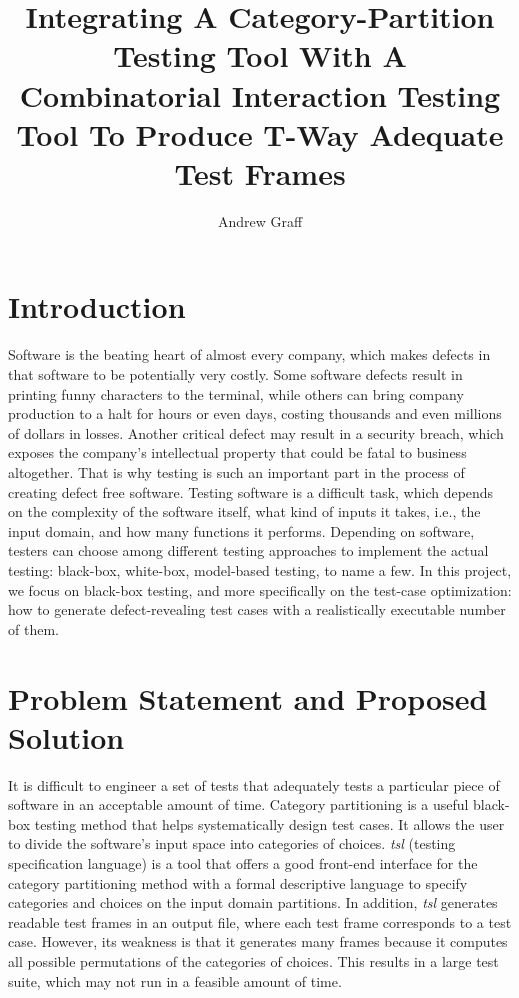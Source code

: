\documentclass[a4full,12pt]{article}
\title{Integrating A Category-Partition Testing Tool With A Combinatorial Interaction
Testing Tool To Produce T-Way Adequate Test Frames}
\author{Andrew Graff}
\begin{document}
\maketitle
\section{Introduction}
Software is the beating heart of almost every company, which makes defects in that software
 to be potentially very costly. Some software defects result in printing funny characters to the terminal, while others can bring
  company production to a halt for hours or even days, costing thousands and even millions of
  dollars in losses. Another critical defect may result in a security breach, which exposes the company's intellectual property that
  could be fatal to business altogether. That is why testing is such an important part in
  the process of creating defect free software. Testing software is a difficult task, which
  depends on the complexity of the software itself, what kind of inputs it takes, i.e., the input domain, and how
  many functions it performs. Depending on software, testers can choose among different testing approaches
  to implement the actual testing: black-box, white-box, model-based testing, to name a few. In this project, we   
  focus on black-box testing, and more specifically on the test-case optimization: how to generate defect-revealing test cases with a realistically executable number of them.
  
\section{Problem Statement and Proposed Solution}
It is difficult to engineer a set of tests that adequately tests a particular piece of software
  in an acceptable amount of time. Category partitioning is a useful black-box testing method that
  helps systematically design test cases. It allows the user to divide
   the software's input space into categories of choices. \emph{tsl} (testing specification language) is a tool
  that offers a good front-end interface for the category partitioning method with a formal descriptive language
  to specify categories and choices on the input domain partitions. In addition, \emph{tsl} generates readable test frames in an output file, where each test frame corresponds to a test case. However, its weakness is that it generates many frames because it computes all possible permutations of the categories of choices. This results in a large test suite, which may not run in a feasible amount of time.
  
\end{document}
